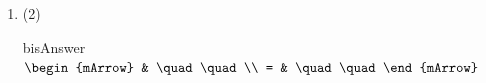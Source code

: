 \begin{enumerate}[resume]	
  \item \quad\quad\quad%
  \begin{subtask}(2)
    \task[]  $ \quad\quad  $
              \begin{envOut}[height=6cm]{bisAnswer}
			       $\begin{mArrow}
			                & \quad\quad       \\ 
                          = & \quad\quad  
	                \end{mArrow}$
              \end{envOut}			  
			  \begin{exercise}\begin{shortsolution}  
				       $$
			  \end{shortsolution}\end{exercise}
  \end{subtask} 			  
\end{enumerate}